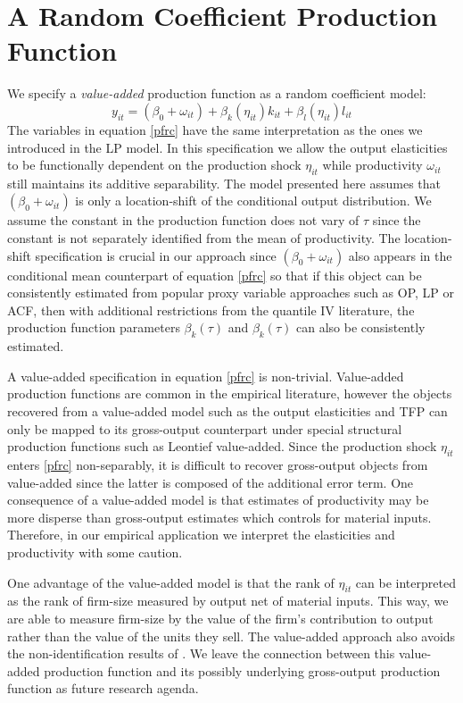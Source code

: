 \documentclass[11pt]{article}
\begin{document}
\section{A Random Coefficient Production Function} \label{ourmodel}
We specify a \textit{value-added} production function as a random coefficient model:
\begin{equation} \label{pfrc}
    y_{it}=(\beta_{0}+\omega_{it})+\beta_{k}(\eta_{it})k_{it}+\beta_{l}(\eta_{it})l_{it}
\end{equation}
The variables in equation \eqref{pfrc} have the same interpretation as the ones we introduced in the LP model. In this specification we allow the output elasticities to be functionally dependent on the production shock $\eta_{it}$ while productivity $\omega_{it}$ still maintains its additive separability. The model presented here assumes that $(\beta_{0}+\omega_{it})$ is only a location-shift of the conditional output distribution. We assume the constant in the production function does not vary of $\tau$ since the constant is not separately identified from the mean of productivity. The location-shift specification is crucial in our approach since $(\beta_{0}+\omega_{it})$ also appears in the conditional mean counterpart of equation \eqref{pfrc} so that if this object can be consistently estimated from popular proxy variable approaches such as OP, LP or ACF, then with additional restrictions from the quantile IV literature, the production function parameters $\beta_{k}(\tau)$ and $\beta_{k}(\tau)$ can also be consistently estimated.

A value-added specification in equation \eqref{pfrc} is non-trivial. Value-added production functions are common in the empirical literature, however the objects recovered from a value-added model such as the output elasticities and TFP can only be mapped to its gross-output counterpart under special structural production functions such as Leontief value-added. Since the production shock $\eta_{it}$ enters \eqref{pfrc} non-separably, it is difficult to recover gross-output objects from value-added since the latter is composed of the additional error term. One consequence of a value-added model is that estimates of productivity may be more disperse than gross-output estimates which controls for material inputs. Therefore, in our empirical application we interpret the elasticities and productivity with some caution.

 One advantage of the value-added model is that the rank of $\eta_{it}$ can be interpreted as the rank of firm-size measured by output net of material inputs. This way, we are able to measure firm-size by the value of the firm's contribution to output rather than the value of the units they sell. The value-added approach also avoids the non-identification results of \cite{Gandhi2020}. We leave the connection between this value-added production function and its possibly underlying gross-output production function as future research agenda.
\end{document}
